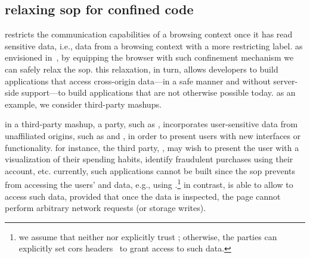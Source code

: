 \subsection{relaxing sop for confined code}
\label{sec:system:mashup}
%
\sys{} restricts the communication capabilities of a browsing context
once it has read sensitive data, i.e., data from a browsing context
with a more restricting label.
%
as envisioned in~\cite{yang:2013:towards}, by equipping the browser with such
confinement mechanism we can safely relax the sop.
%
this relaxation, in turn, allows developers to build applications that access
cross-origin data---in a safe manner and without server-side support---to build
applications that are not otherwise possible today.
%
as an example, we consider third-party mashups.

in a third-party mashup, a party, such as ,
incorporates user-sensitive data from unaffiliated origins, such as
 and , in order to present users with new
interfaces or functionality.
%
for instance, the third party, , may wish to present the user with a
visualization of their spending habits, identify fraudulent
 purchases using their  account, etc.
%
currently, such applications cannot be built since the sop prevents
 from accessing the users'  and
 data, e.g., using \xhr{}.\footnote{
 we assume that neither  nor 
 explicitly trust ; otherwise, the parties can
 explicitly set cors headers~\cite{cors13} to grant 
 access to such data.
}
%
in contrast, \sys{} is able to allow  to access such
data, provided that once the data is inspected, the page cannot
perform arbitrary network requests (or storage writes).
 
